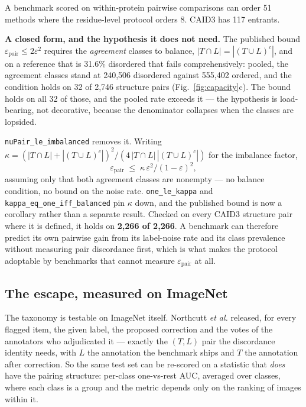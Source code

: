 \documentclass[11pt,a4paper]{article}
\newcommand{\eps}{\varepsilon}
\newcommand{\code}[1]{\texttt{\small #1}}
\begin{document}
\noindent
A benchmark scored on within-protein pairwise comparisons can order 51 methods
where the residue-level protocol orders 8. CAID3 has 117 entrants.

\textbf{A closed form, and the hypothesis it does not need.} The published bound
$\eps_{\text{pair}} \le 2\eps^2$ requires the \emph{agreement} classes to
balance, $|T \cap L| = |(T \cup L)^{c}|$, and on a reference that is 31.6\%
disordered that fails comprehensively: pooled, the agreement classes stand at
240{,}506 disordered against 555{,}402 ordered, and the condition holds on 32 of
2{,}746 structure pairs (Fig.~\ref{fig:capacity}c). The bound holds on all 32 of
those, and the pooled rate exceeds it --- the hypothesis is load-bearing, not
decorative, because the denominator collapses when the classes are lopsided.

\code{nuPair\_le\_imbalanced} removes it. Writing
$\kappa = (|T \cap L| + |(T \cup L)^{c}|)^2 / (4\,|T \cap L|\,|(T \cup L)^{c}|)$
for the imbalance factor,
\[
  \eps_{\text{pair}} \;\le\; \kappa\,\eps^2 / (1-\eps)^2 ,
\]
assuming only that both agreement classes are nonempty --- no balance condition,
no bound on the noise rate. \code{one\_le\_kappa} and
\code{kappa\_eq\_one\_iff\_balanced} pin $\kappa$ down, and the published bound is
now a corollary rather than a separate result. Checked on every CAID3 structure
pair where it is defined, it holds on \textbf{2{,}266 of 2{,}266}. A benchmark
can therefore predict its own pairwise gain from its label-noise rate and its
class prevalence without measuring pair discordance first, which is what makes
the protocol adoptable by benchmarks that cannot measure $\eps_{\text{pair}}$ at
all.

\subsection*{The escape, measured on ImageNet}

The taxonomy is testable on ImageNet itself. Northcutt \emph{et al.} released,
for every flagged item, the given label, the proposed correction and the votes
of the annotators who adjudicated it --- exactly the $(T, L)$ pair the
discordance identity needs, with $L$ the annotation the benchmark ships and $T$
the annotation after correction. So the same test set can be re-scored on a
statistic that \emph{does} have the pairing structure: per-class one-vs-rest
AUC, averaged over classes, where each class is a group and the metric depends
only on the ranking of images within it.
\end{document}
